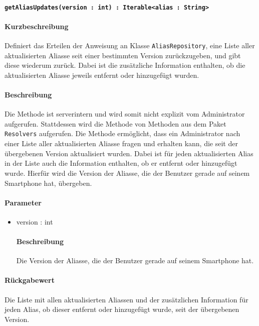 \paragraph{\texttt{getAliasUpdates(version : int) : Iterable<alias : String>}}%
\paragraph*{Kurzbeschreibung}
Definiert das Erteilen der Anweisung an Klasse \texttt{AliasRepository}, eine Liste aller aktualisierten Aliasse seit einer bestimmten Version zurückzugeben, und gibt diese wiederum zurück. Dabei ist die zusätzliche Information enthalten, ob die aktualisierten Aliasse jeweils entfernt oder hinzugefügt wurden.
\paragraph*{Beschreibung}
Die Methode ist serverintern und wird somit nicht explizit vom Administrator aufgerufen.
Stattdessen wird die Methode von Methoden aus dem Paket \texttt{Resolvers} aufgerufen.
Die Methode ermöglicht, dass ein Administrator nach einer Liste aller aktualisierten Aliasse fragen und erhalten kann, die seit der übergebenen Version aktualisiert wurden.
Dabei ist für jeden aktualisierten Alias in der Liste auch die Information enthalten, ob er entfernt oder hinzugefügt wurde.
Hierfür wird die Version der Aliasse, die der Benutzer gerade auf seinem Smartphone hat, übergeben.
\paragraph*{Parameter}
\begin{itemize}
    \item version : int
    		\paragraph*{Beschreibung}
    		Die Version der Aliasse, die der Benutzer gerade auf seinem Smartphone hat.
\end{itemize}
\paragraph*{Rückgabewert}
Die Liste mit allen aktualisierten Aliassen und der zusätzlichen Information für jeden Alias, ob dieser entfernt oder hinzugefügt wurde, seit der übergebenen Version.
